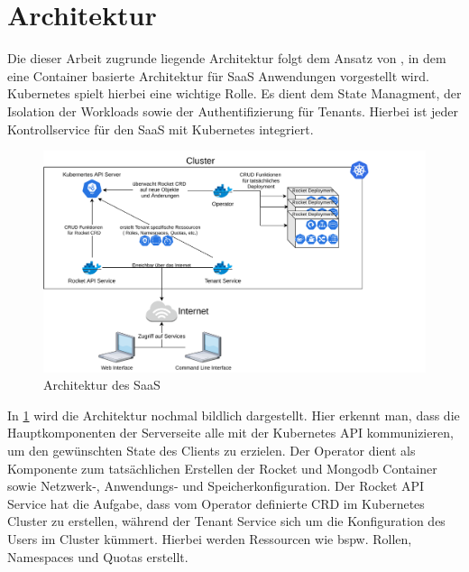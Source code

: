 \section{Architektur}
\label{sec:komponenten:architektur}

Die dieser Arbeit zugrunde liegende Architektur folgt dem Ansatz von \cite{Truyen2016}, in dem eine Container basierte
Architektur für \ac{SaaS} Anwendungen vorgestellt wird. Kubernetes spielt hierbei eine wichtige Rolle. Es dient dem State
Managment, der Isolation der Workloads sowie der Authentifizierung für Tenants. Hierbei ist jeder Kontrollservice für den \ac{SaaS}
mit Kubernetes integriert.

\begin{figure}
  \includegraphics[width=45em]{gfx/chapters/3_komponenten/saas_architecture.pdf}
  \caption{Architektur des \ac{SaaS}}
  \label{fig:architektur}
\end{figure}

In \ref{fig:architektur} wird die Architektur nochmal bildlich dargestellt.
Hier erkennt man, dass die Hauptkomponenten der Serverseite alle mit der Kubernetes API kommunizieren,
um den gewünschten State des Clients zu erzielen. Der Operator dient als Komponente zum tatsächlichen
Erstellen der Rocket und Mongodb Container sowie Netzwerk-, Anwendungs- und Speicherkonfiguration.
Der Rocket API Service hat die Aufgabe, dass vom Operator definierte \ac{CRD} im Kubernetes Cluster zu erstellen,
während der Tenant Service sich um die Konfiguration des Users im Cluster kümmert.
Hierbei werden Ressourcen wie bspw. Rollen, Namespaces und Quotas erstellt.